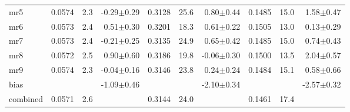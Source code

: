 \documentclass{article}
\begin{document}
\begin{table*}
\begin{center}
\begin{small}
\begin{sc}
\begin{tabular}{l|rr r|rr r|rr r}
mr5        & 0.0574 &   2.3 & -0.29$\pm$0.29& 0.3128 &  25.6 &  0.80$\pm$0.44& 0.1485 &  15.0 &  1.58$\pm$0.47 \\ 
mr6        & 0.0573 &   2.4 &  0.51$\pm$0.30& 0.3201 &  18.3 &  0.61$\pm$0.22& 0.1505 &  13.0 &  0.13$\pm$0.29 \\ 
mr7        & 0.0573 &   2.4 & -0.21$\pm$0.25& 0.3135 &  24.9 &  0.65$\pm$0.42& 0.1485 &  15.0 &  0.74$\pm$0.43 \\ 
mr8        & 0.0572 &   2.5 &  0.90$\pm$0.60& 0.3186 &  19.8 & -0.06$\pm$0.30& 0.1500 &  13.5 &  2.04$\pm$0.57 \\ 
mr9        & 0.0574 &   2.3 & -0.04$\pm$0.16& 0.3146 &  23.8 &  0.24$\pm$0.24& 0.1484 &  15.1 &  0.58$\pm$0.66 \\ 
\abovespace
bias       &        &       & -1.09$\pm$0.46&        &       & -2.10$\pm$0.34&        &       & -2.57$\pm$0.32 \\ 
\abovespace\belowspace
combined   & 0.0571 &   2.6 &  & 0.3144 &  24.0 &  & 0.1461 &  17.4 &   \\ 
\hline
\end{tabular}
\end{sc}
\end{small}
\end{center}
\vskip -0.1in
\end{table*}


\end{document}
